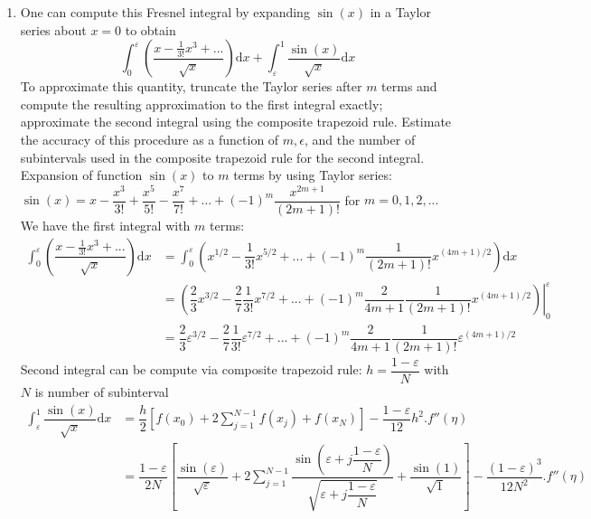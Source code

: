 \documentclass[14pt,a4paper]{article}
\begin{document}
\begin{enumerate}
	\label{1b}
	\item One can compute this Fresnel integral by expanding $\sin(x)$ in a Taylor series about $x=0$ to obtain
	$$\int_{0}^{\varepsilon}\left(\dfrac{x - \frac{1}{3!}x^3 + ...}{\sqrt{x}}\right)\mathrm{d}x + \int_{\varepsilon}^{1}\dfrac{\sin(x)}{\sqrt{x}}\mathrm{d}x$$
	To approximate this quantity, truncate the Taylor series after $m$ terms and compute the resulting approximation to the first integral exactly; approximate the second integral using the composite trapezoid rule. Estimate the accuracy of this procedure as a function of $m,\epsilon$, and the number of subintervals used in the composite trapezoid rule for the second integral.\\
	Expansion of function $\sin(x)$ to $m$ terms by using Taylor series:\\
	\hspace*{2cm}$\sin(x) = x - \dfrac{x^3}{3!} + \dfrac{x^5}{5!} - \dfrac{x^7}{7!} + ... + (-1)^{m}\dfrac{x^{2m+1}}{(2m+1)!} $ \hspace{1cm} for $m = 0,1,2, ...$\\
	We have the first integral with $m$ terms:
	\begin{align*} \int_{0}^{\varepsilon}\left(\dfrac{x - \frac{1}{3!}x^3 + ...}{\sqrt{x}}\right)\mathrm{d}x &= \int_{0}^{\varepsilon} \left(x^{1/2} - \dfrac{1}{3!}x^{5/2} +  ... + (-1)^{m}\dfrac{1}{(2m+1)!}x^{(4m+1)/2} \right) \mathrm{d}x \\
	&= \left.\left( \dfrac{2}{3}x^{3/2} - \dfrac{2}{7}\dfrac{1}{3!}x^{7/2} +  ... + (-1)^m\dfrac{2}{4m+1}\dfrac{1}{(2m+1)!}x^{(4m+1)/2} \right)\right|_0^{\varepsilon}\\
	&= \dfrac{2}{3}\varepsilon^{3/2} - \dfrac{2}{7}\dfrac{1}{3!}\varepsilon^{7/2} +  ... + (-1)^m\dfrac{2}{4m+1}\dfrac{1}{(2m+1)!}\varepsilon^{(4m+1)/2}
	\end{align*}
	Second integral can be compute via composite trapezoid rule: $h = \dfrac{1-\varepsilon}{N}$ with $N$ is number of subinterval
	\begin{align*} \int_{\varepsilon}^{1}\dfrac{\sin(x)}{\sqrt{x}}\mathrm{d}x &= \dfrac{h}{2}\left[ f(x_0) + 2\sum_{j=1}^{N-1}f(x_j) + f(x_N)\right] -\dfrac{1-\varepsilon}{12}h^2.f''(\eta) \\
	&= \dfrac{1-\varepsilon}{2N}\left[ \dfrac{\sin(\varepsilon)}{\sqrt{\varepsilon}} + 2\sum_{j=1}^{N-1} \dfrac{\sin(\varepsilon + j\dfrac{1-\varepsilon}{N})}{\sqrt{\varepsilon+j\dfrac{1-\varepsilon}{N}}} + \dfrac{\sin(1)}{\sqrt{1}}  \right] - \dfrac{(1-\varepsilon)^3}{12N^2}.f''(\eta)
	\end{align*}

\end{enumerate}
\end{document}
